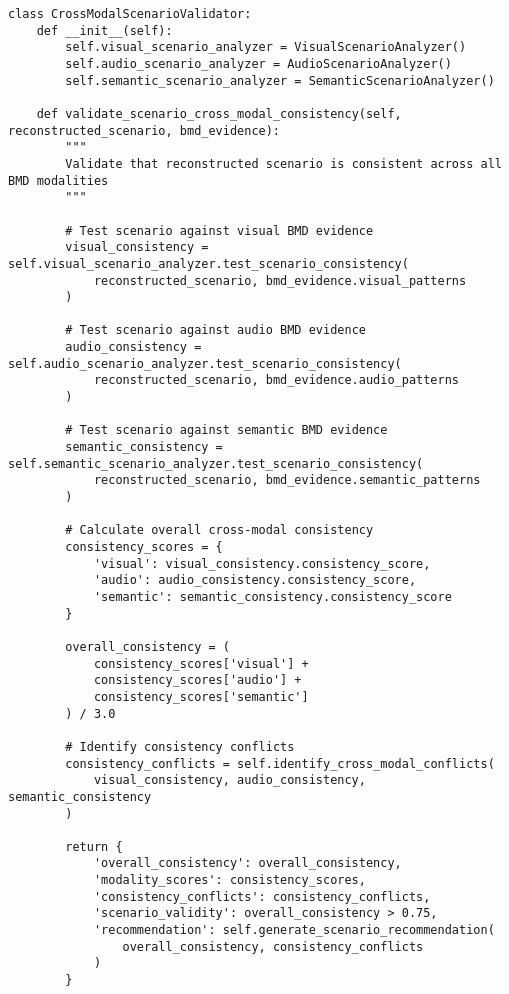 \documentclass[12pt,a4paper]{article}
\begin{document}
\begin{lstlisting}[style=pythonstyle, caption=Cross-Modal Scenario Consistency Validation]
class CrossModalScenarioValidator:
    def __init__(self):
        self.visual_scenario_analyzer = VisualScenarioAnalyzer()
        self.audio_scenario_analyzer = AudioScenarioAnalyzer() 
        self.semantic_scenario_analyzer = SemanticScenarioAnalyzer()
        
    def validate_scenario_cross_modal_consistency(self, reconstructed_scenario, bmd_evidence):
        """
        Validate that reconstructed scenario is consistent across all BMD modalities
        """
        
        # Test scenario against visual BMD evidence
        visual_consistency = self.visual_scenario_analyzer.test_scenario_consistency(
            reconstructed_scenario, bmd_evidence.visual_patterns
        )
        
        # Test scenario against audio BMD evidence  
        audio_consistency = self.audio_scenario_analyzer.test_scenario_consistency(
            reconstructed_scenario, bmd_evidence.audio_patterns
        )
        
        # Test scenario against semantic BMD evidence
        semantic_consistency = self.semantic_scenario_analyzer.test_scenario_consistency(
            reconstructed_scenario, bmd_evidence.semantic_patterns
        )
        
        # Calculate overall cross-modal consistency
        consistency_scores = {
            'visual': visual_consistency.consistency_score,
            'audio': audio_consistency.consistency_score,
            'semantic': semantic_consistency.consistency_score
        }
        
        overall_consistency = (
            consistency_scores['visual'] + 
            consistency_scores['audio'] + 
            consistency_scores['semantic']
        ) / 3.0
        
        # Identify consistency conflicts
        consistency_conflicts = self.identify_cross_modal_conflicts(
            visual_consistency, audio_consistency, semantic_consistency
        )
        
        return {
            'overall_consistency': overall_consistency,
            'modality_scores': consistency_scores,
            'consistency_conflicts': consistency_conflicts,
            'scenario_validity': overall_consistency > 0.75,
            'recommendation': self.generate_scenario_recommendation(
                overall_consistency, consistency_conflicts
            )
        }
    

\end{lstlisting}
\end{document}
